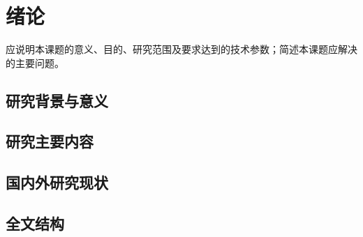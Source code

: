 
\chapter{绪论}
应说明本课题的意义、目的、研究范围及要求达到的技术参数；简述本课题应解决的主要问题。
\section{研究背景与意义}
\section{研究主要内容}
\section{国内外研究现状}
\section{全文结构}
